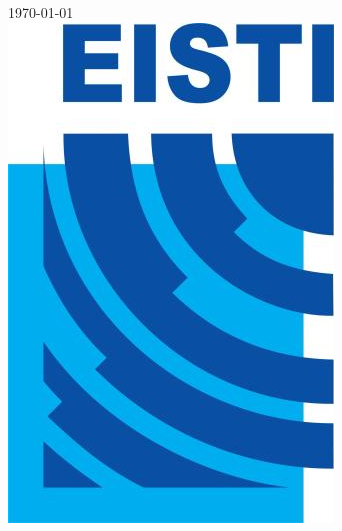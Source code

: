 \documentclass[12pt]{article}
\begin{document}
\begin{titlepage}


{\large \today}\\[3cm] %


\includegraphics[scale=.25]{EISTI.jpg}\\[1cm] %
 

\vfill %

\end{titlepage}
\renewcommand{\contentsname}{Sommaire}
\doublespacing
\tableofcontents
\singlespacing
\end{document}
